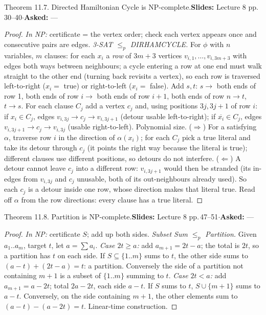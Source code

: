 \documentclass[10.5pt,a4paper]{article}
\newcommand{\src}[2]{{\footnotesize\color{gray!70!black}\textbf{Slides:} #1\enspace$\cdot$\enspace\textbf{Asked:} #2}\par}
\begin{document}
\begin{thm}{Theorem 11.7. Directed Hamiltonian Cycle is NP-complete.}\src{Lecture 8 pp.\,30--40}{---}\end{thm}
\begin{proof}
\emph{In NP:} certificate = the vertex order; check each vertex appears once and consecutive pairs are edges.
\emph{3-SAT $\le_p$ DIRHAMCYCLE.} For $\phi$ with $n$ variables, $m$ clauses: for each $x_i$ a \emph{row} of $3m+3$ vertices
$v_{i,1},\dots,v_{i,3m+3}$ with edges both ways between neighbours; a cycle entering a row at one end must walk straight to the other end
(turning back revisits a vertex), so each row is traversed left-to-right ($x_i=$ true) or right-to-left ($x_i=$ false). Add $s,t$: $s\to$ both
ends of row 1, both ends of row $i\to$ both ends of row $i+1$, both ends of row $n\to t$, $t\to s$. For each clause $C_j$ add a vertex $c_j$ and,
using positions $3j,3j+1$ of row $i$: if $x_i\in C_j$, edges $v_{i,3j}\to c_j\to v_{i,3j+1}$ (detour usable left-to-right); if
$\overline{x_i}\in C_j$, edges $v_{i,3j+1}\to c_j\to v_{i,3j}$ (usable right-to-left). Polynomial size.
($\Rightarrow$) For a satisfying $\alpha$, traverse row $i$ in the direction of $\alpha(x_i)$; for each $C_j$ pick a true literal and take its detour
through $c_j$ (it points the right way because the literal is true); different clauses use different positions, so detours do not interfere.
($\Leftarrow$) A detour cannot leave $c_j$ into a different row: $v_{i,3j+1}$ would then be stranded (its in-edges from $v_{i,3j}$ and $c_j$ unusable,
both of its out-neighbours already used). So each $c_j$ is a detour inside one row, whose direction makes that literal true. Read off $\alpha$ from the
row directions: every clause has a true literal.
\end{proof}

\begin{thm}{Theorem 11.8. Partition is NP-complete.}\src{Lecture 8 pp.\,47--51}{---}\end{thm}
\begin{proof}
\emph{In NP:} certificate $S$; add up both sides. \emph{Subset Sum $\le_p$ Partition.} Given $a_1..a_m$, target $t$, let $a=\sum a_i$.
\emph{Case $2t\ge a$:} add $a_{m+1}=2t-a$; the total is $2t$, so a partition has $t$ on each side. If $S\subseteq\{1..m\}$ sums to $t$, the other
side sums to $(a-t)+(2t-a)=t$: a partition. Conversely the side of a partition not containing $m+1$ is a subset of $\{1..m\}$ summing to $t$.
\emph{Case $2t<a$:} add $a_{m+1}=a-2t$; total $2a-2t$, each side $a-t$. If $S$ sums to $t$, $S\cup\{m+1\}$ sums to $a-t$. Conversely, on the side
containing $m+1$, the other elements sum to $(a-t)-(a-2t)=t$. Linear-time construction.
\end{proof}
\end{document}
